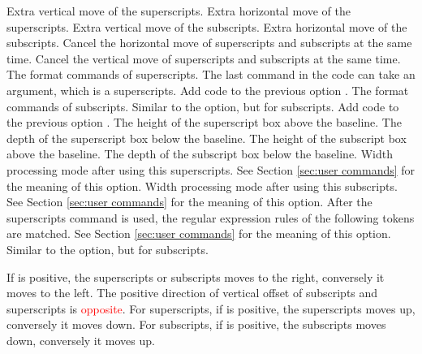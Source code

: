 \documentclass[load-preamble+]{cnltx-doc}
\begin{document}
\begin{options}
  \Default{0pt}
  Extra vertical move of the superscripts.
  \Default{0pt}
  Extra horizontal move of the superscripts.
  \Default{0pt}
  Extra vertical move of the subscripts.
  \Default{0pt}
  Extra horizontal move of the subscripts.
  Cancel the horizontal move of superscripts and subscripts at the same time.
  Cancel the vertical move of superscripts and subscripts at the same time.
  The format commands of superscripts. The last command in the code can take an argument, which is a superscripts.
  Add code to the previous option .
  The format commands of subscripts. Similar to the  option, but for subscripts.
  Add code to the previous option .
  The height of the superscript box above the baseline.
  The depth of the superscript box below the baseline.
  The height of the subscript box above the baseline.
  The depth of the subscript box below the baseline.
  Width processing mode after using this superscripts. See Section \ref{sec:user commands} for the meaning of this option.
  Width processing mode after using this subscripts. See Section \ref{sec:user commands} for the meaning of this option.
  After the superscripts command is used, the regular expression rules of the following tokens are matched. See Section \ref{sec:user commands} for the meaning of this option.
  Similar to the  option, but for subscripts.
\end{options}

If  is positive, the superscripts or subscripts moves to the right, conversely it moves to the left. The positive direction of vertical offset of subscripts and superscripts is \textcolor{red}{opposite}. For superscripts, if  is positive, the superscripts moves up, conversely it moves down. For subscripts, if  is positive, the subscripts moves down, conversely it moves up.
\end{document}
